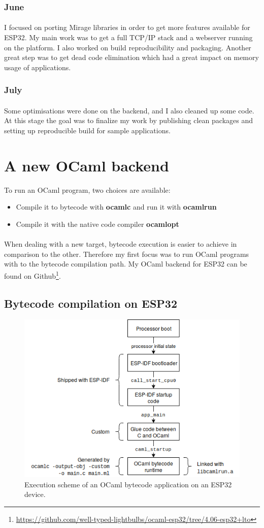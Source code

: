 \documentclass[a4paper]{article}
\begin{document}
\subsubsection{June}
\paragraph{}
I focused on porting Mirage libraries in order to get more features available for ESP32. My main work was to get a full TCP/IP stack and a webserver running on the platform. I also worked on build reproducibility and packaging. Another great step was to get dead code elimination which had a great impact on memory usage of applications.
\subsubsection{July}
\paragraph{}
Some optimisations were done on the backend, and I also cleaned up some code. At this stage the goal was to finalize my work by publishing clean packages and setting up reproducible build for sample applications. 

\section{A new OCaml backend}
To run an OCaml program, two choices are available: 
\begin{itemize}[itemsep=0pt,parsep=0pt]
    \item Compile it to bytecode with \textbf{ocamlc} and run it with \textbf{ocamlrun}
    \item Compile it with the native code compiler \textbf{ocamlopt}
\end{itemize}
\paragraph{}
When dealing with a new target, bytecode execution is easier to achieve in comparison to the other.
Therefore my first focus was to run OCaml programs with to the bytecode compilation path. My OCaml backend for ESP32 can be found on Github\footnote{\url{https://github.com/well-typed-lightbulbs/ocaml-esp32/tree/4.06-esp32+lto}}.
\subsection{Bytecode compilation on ESP32}
\begin{figure}
\includegraphics[width=0.5\columnwidth]{Bytecode_comp.png}
\caption{Execution scheme of an OCaml bytecode application on an ESP32 device.}
\end{figure}
\end{document}
